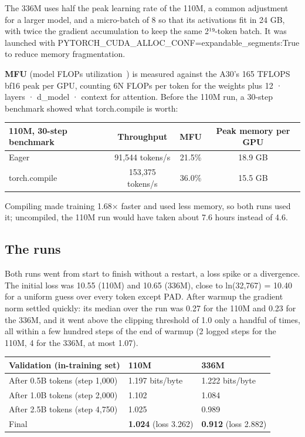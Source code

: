 \documentclass[11pt]{article}
\begin{document}
The 336M uses half the peak learning rate of the 110M, a common adjustment for a larger model, and a micro-batch of 8 so that its activations fit in 24 GB, with twice the gradient accumulation to keep the same 2¹⁹-token batch. It was launched with PYTORCH\_\allowbreak{}CUDA\_\allowbreak{}ALLOC\_\allowbreak{}CONF=\allowbreak{}expandable\_\allowbreak{}segments:True to reduce memory fragmentation.

\textbf{MFU} (model FLOPs utilization~\citep{chowdhery2022palm}) is measured against the A30's 165 TFLOPS bf16 peak per GPU, counting 6N FLOPs per token for the weights plus 12 · layers · d\_\allowbreak{}model · context for attention. Before the 110M run, a 30-step benchmark showed what torch.compile is worth:

\begin{center}
\small
\begin{tabular}{lccc}
\toprule
\textbf{110M, 30-step benchmark} & \textbf{Throughput} & \textbf{MFU} & \textbf{Peak memory per GPU} \\
\midrule
Eager & 91,544 tokens/\allowbreak{}s & 21.5\% & 18.9 GB \\
torch.compile & 153,375 tokens/\allowbreak{}s & 36.0\% & 15.5 GB \\
\bottomrule
\end{tabular}
\end{center}

Compiling made training 1.68× faster and used less memory, so both runs used it; uncompiled, the 110M run would have taken about 7.6 hours instead of 4.6.

\subsection{The runs}

Both runs went from start to finish without a restart, a loss spike or a divergence. The initial loss was 10.55 (110M) and 10.65 (336M), close to ln(32,767) = 10.40 for a uniform guess over every token except PAD. After warmup the gradient norm settled quickly: its median over the run was 0.27 for the 110M and 0.23 for the 336M, and it went above the clipping threshold of 1.0 only a handful of times, all within a few hundred steps of the end of warmup (2 logged steps for the 110M, 4 for the 336M, at most 1.07).

\begin{center}
\small
\begin{tabular}{lll}
\toprule
\textbf{Validation (in-training set)} & \textbf{110M} & \textbf{336M} \\
\midrule
After 0.5B tokens (step 1,000) & 1.197 bits/\allowbreak{}byte & 1.222 bits/\allowbreak{}byte \\
After 1.0B tokens (step 2,000) & 1.102 & 1.084 \\
After 2.5B tokens (step 4,750) & 1.025 & 0.989 \\
Final & \textbf{1.024} (loss 3.262) & \textbf{0.912} (loss 2.882) \\
\bottomrule
\end{tabular}
\end{center}
\end{document}
